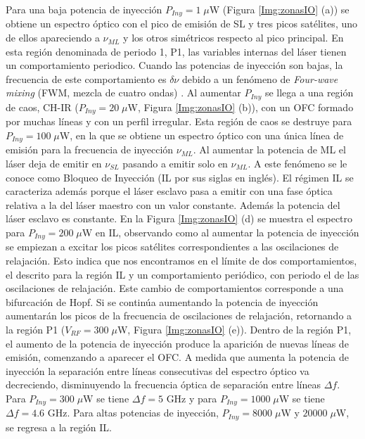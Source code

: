 Para una baja potencia de inyección $P_{Iny} = 1 \; \mu$W (Figura \ref{Img:zonasIO} (a)) se obtiene un espectro óptico con el pico de emisión de SL y tres picos satélites, uno de ellos apareciendo a $\nu_{ML}$ y los otros simétricos respecto al pico principal. En esta región denominada de periodo 1, P1, las variables internas del láser tienen un comportamiento periodico. Cuando las potencias de inyección son bajas, la frecuencia de este comportamiento es $\delta\nu$ debido a un fenómeno de \textit{Four-wave mixing} (FWM, mezcla de cuatro ondas) \cite{van1995semiconductor}. Al aumentar $P_{Iny}$ se llega a una región de caos, CH-IR ($P_{Iny} = 20\; \mu$W, Figura \ref{Img:zonasIO} (b)), con un OFC formado por muchas líneas y con un perfil irregular. Esta región de caos se destruye para $P_{Iny} = 100\;\mu$W, en la que se obtiene un espectro óptico con una única línea de emisión para la frecuencia de inyección $\nu_{ML}$. Al aumentar la potencia de ML el láser deja de emitir en $\nu_{SL}$ pasando a emitir solo en $\nu_{ML}$. A este fenómeno se le conoce como Bloqueo de Inyección (IL por sus siglas en inglés). El régimen IL se caracteriza además porque el láser esclavo pasa a emitir con una fase óptica relativa a la del láser maestro con un valor constante. Además la potencia del láser esclavo es constante. En la Figura \ref{Img:zonasIO} (d) se muestra el espectro para $P_{Iny} = 200\;\mu$W en IL, observando como al aumentar la potencia de inyección se empiezan a excitar los picos satélites correspondientes a las oscilaciones de relajación. Esto indica que nos encontramos en el límite de dos comportamientos, el descrito para la región IL y un comportamiento periódico, con periodo el de las oscilaciones de relajación. Este cambio de comportamientos corresponde a una bifurcación de Hopf. Si se continúa aumentando la potencia de inyección aumentarán los picos de la frecuencia de oscilaciones de relajación, retornando a la región P1 ($V_{RF} = 300\;\mu$W, Figura \ref{Img:zonasIO} (e)). Dentro de la región P1, el aumento de la potencia de inyección produce la aparición de nuevas líneas de emisión, comenzando a aparecer el OFC. A medida que aumenta la potencia de inyección la separación entre líneas consecutivas del espectro óptico va decreciendo, disminuyendo la frecuencia \'optica de separación entre l\'ineas $\Delta f$. Para $P_{Iny} = 300\;\mu$W se tiene $\Delta f = 5$ GHz y para $P_{Iny} = 1000\;\mu$W se tiene $\Delta f = 4.6$ GHz. Para altas potencias de inyección, $P_{Iny} = 8000 \;\mu$W y $20000 \;\mu$W, se regresa a la región IL.

